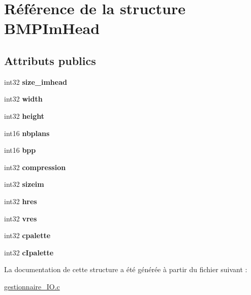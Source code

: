 \hypertarget{structBMPImHead}{}\section{Référence de la structure B\+M\+P\+Im\+Head}
\label{structBMPImHead}
\subsection*{Attributs publics}
\begin{DoxyCompactItemize}
\item 
int32 {\bfseries size\+\_\+imhead}\hypertarget{structBMPImHead_a087db882c472efd632df406b8bca75aa}{}\label{structBMPImHead_a087db882c472efd632df406b8bca75aa}

\item 
int32 {\bfseries width}\hypertarget{structBMPImHead_ad77d6dd453ad6e0032b53ca9e02bd870}{}\label{structBMPImHead_ad77d6dd453ad6e0032b53ca9e02bd870}

\item 
int32 {\bfseries height}\hypertarget{structBMPImHead_abb7665f76c1c21700df1cd01c4f2fe7d}{}\label{structBMPImHead_abb7665f76c1c21700df1cd01c4f2fe7d}

\item 
int16 {\bfseries nbplans}\hypertarget{structBMPImHead_aa0dc40de38a2d515d99b6fdf7a8b5905}{}\label{structBMPImHead_aa0dc40de38a2d515d99b6fdf7a8b5905}

\item 
int16 {\bfseries bpp}\hypertarget{structBMPImHead_a8ab99ab71fcd3a4bdfbca32b9d68aebc}{}\label{structBMPImHead_a8ab99ab71fcd3a4bdfbca32b9d68aebc}

\item 
int32 {\bfseries compression}\hypertarget{structBMPImHead_a6243975b07502791c6633af57f1026ff}{}\label{structBMPImHead_a6243975b07502791c6633af57f1026ff}

\item 
int32 {\bfseries sizeim}\hypertarget{structBMPImHead_a0ac2156b38e1c53226aafde050189fe0}{}\label{structBMPImHead_a0ac2156b38e1c53226aafde050189fe0}

\item 
int32 {\bfseries hres}\hypertarget{structBMPImHead_a51803597f55adc3bc88a2337e9fb5439}{}\label{structBMPImHead_a51803597f55adc3bc88a2337e9fb5439}

\item 
int32 {\bfseries vres}\hypertarget{structBMPImHead_aa6b95a88db995470ac6ac439db7b1353}{}\label{structBMPImHead_aa6b95a88db995470ac6ac439db7b1353}

\item 
int32 {\bfseries cpalette}\hypertarget{structBMPImHead_a713742cf99ef4cf940950087ba4a4573}{}\label{structBMPImHead_a713742cf99ef4cf940950087ba4a4573}

\item 
int32 {\bfseries c\+Ipalette}\hypertarget{structBMPImHead_a182bbe31daf1af6e415d8c73635caace}{}\label{structBMPImHead_a182bbe31daf1af6e415d8c73635caace}

\end{DoxyCompactItemize}


La documentation de cette structure a été générée à partir du fichier suivant \+:\begin{DoxyCompactItemize}
\item 
\hyperlink{gestionnaire__IO_8c}{gestionnaire\+\_\+\+I\+O.\+c}\end{DoxyCompactItemize}
